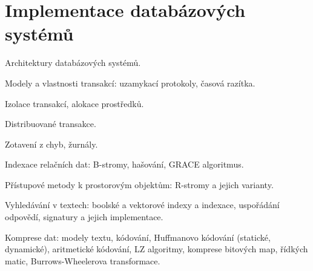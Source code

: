 \newpage
\section{Implementace databázových systémů}
\begin{pozadavky}
\begin{pitemize}
\item Architektury databázových systémů.
\item Modely a vlastnosti transakcí: uzamykací protokoly, časová razítka.
\item Izolace transakcí, alokace prostředků.
\item Distribuované transakce.
\item Zotavení z chyb, žurnály.
\item Indexace relačních dat: B-stromy, hašování, GRACE algoritmus.
\item Přístupové metody k prostorovým objektům: R-stromy a jejich varianty.
\item Vyhledávání v textech: boolské a vektorové indexy a indexace, uspořádání odpovědí, signatury a jejich implementace.
\item Komprese dat: modely textu, kódování, Huffmanovo kódování (statické, dynamické), aritmetické kódování, LZ algoritmy, komprese bitových map, řídkých matic, Burrows-Wheelerova transformace.
\end{pitemize}
\end{pozadavky}